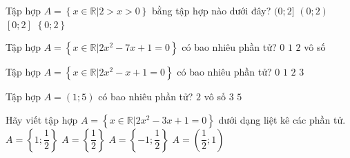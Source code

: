 \begin{ex}%
	Tập hợp $A=\left\{x\in \mathbb{R}\big| 2>x>0 \right\}$ bằng tập hợp nào dưới đây? 
	\choice
	{$(0; 2]$}
	{\True $(0; 2)$}
	{$[0; 2]$}
	{$\left\{0; 2\right\}$}
\end{ex}

\begin{ex}%
	Tập hợp $A=\left\{x\in \mathbb{R}\big| 2x^2-7x+1=0\right\}$ có bao nhiêu phần tử?
	\choice
	{$0$}
	{$1$}
	{\True $2$}
	{vô số}
\end{ex}

\begin{ex}%
	Tập hợp $A=\left\{x\in \mathbb{R}\big| 2x^2-x+1=0\right\}$ có bao nhiêu phần tử?
	\choice
	{\True $0$}
	{$1$}
	{$2$}
	{$3$}
\end{ex}

\begin{ex}%
	Tập hợp $A=(1;5)$ có bao nhiêu phần tử?
	\choice
	{$2$}
	{\True vô số}
	{$3$}
	{$5$}
\end{ex}

\begin{ex}%
	Hãy viết tập hợp $A=\left\{x\in \mathbb{R}\big| 2x^2-3x+1=0\right\}$ dưới dạng liệt kê các phần tử.
	\choice
	{\True $A=\left\{1; \dfrac{1}{2}\right\}$}
	{$A=\left\{\dfrac{1}{2}\right\}$}
	{$A=\left\{-1; \dfrac{1}{2}\right\}$}
	{$A=\left(\dfrac{1}{2}; 1\right)$}
\end{ex}

